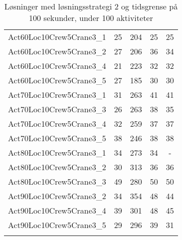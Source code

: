 {\begin{center}
\begin{longtable}{ | l | c | c | c | c | }
Act60Loc10Crew5Crane3\_1	&	25	&	204	&	25	&	25	\\
Act60Loc10Crew5Crane3\_2	&	27	&	206	&	36	&	34	\\
Act60Loc10Crew5Crane3\_4	&	21	&	223	&	32	&	32	\\
Act60Loc10Crew5Crane3\_5	&	27	&	185	&	30	&	30	\\
Act70Loc10Crew5Crane3\_1	&	31	&	263	&	41	&	41	\\
Act70Loc10Crew5Crane3\_3	&	26	&	263	&	38	&	35	\\
Act70Loc10Crew5Crane3\_4	&	32	&	259	&	37	&	37	\\
Act70Loc10Crew5Crane3\_5	&	38	&	246	&	38	&	38	\\
Act80Loc10Crew5Crane3\_1	&	34	&	273	&	34	&	-	\\
Act80Loc10Crew5Crane3\_2	&	30	&	313	&	36	&	36	\\
Act80Loc10Crew5Crane3\_3	&	49	&	280	&	50	&	50	\\
Act90Loc10Crew5Crane3\_2	&	34	&	354	&	48	&	44	\\
Act90Loc10Crew5Crane3\_4	&	39	&	301	&	48	&	45	\\
Act90Loc10Crew5Crane3\_5	&	29	&	296	&	39	&	31	\\
\hline			
\caption{Løsninger med løsningsstrategi 2 og tidsgrense på 100 sekunder, under 100 aktiviteter}							
\label{tab:solutionSSTFAARF100s}								
\end{longtable}				
\end{center}

}
